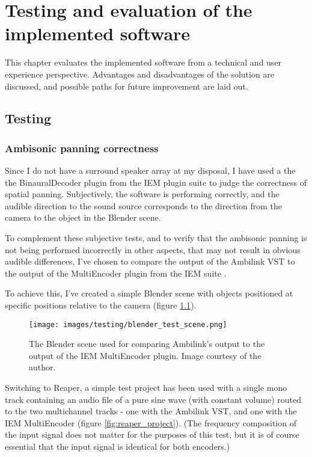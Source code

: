 \chapter{Testing and evaluation of the implemented software}
\begin{chapterabstract}
    This chapter evaluates the implemented software from a technical and user experience perspective.
    Advantages and disadvantages of the solution are discussed, and possible paths for 
    future improvement are laid out. 
\end{chapterabstract}

\section{Testing}
\subsection{Ambisonic panning correctness}
Since I do not have a surround speaker array at my disposal, I have used a the 
the BinauralDecoder plugin from the IEM plugin suite \cite{iem_plugin_suite} to judge the 
correctness of spatial panning. Subjectively, the software is performing correctly, 
and the audible direction to the sound source corresponds to the direction from the camera to 
the object in the Blender scene.

To complement these subjective tests, and to verify that the ambisonic panning is not 
being performed incorrectly in other aspects, that may not result in obvious audible differences,
I've chosen to compare the output of the Ambilink VST to the output of the MultiEncoder plugin from the IEM suite \cite{iem_plugin_suite}.

To achieve this, I've created a simple Blender scene with objects positioned
at specific positions relative to the camera (figure \ref{fig:blender_test_scene}).
\begin{figure}
    \centering
    \texttt{[image: images/testing/blender\_test\_scene.png]}       
    \caption{The Blender scene used for comparing Ambilink's output to the output of the IEM MultiEncoder plugin.
        Image courtesy of the author.
        \label{fig:blender_test_scene}}
\end{figure}
Switching to Reaper, a simple test project has been used with a single mono track containing an audio file 
of a pure sine wave (with constant volume) routed to the two multichannel tracks - one with the Ambilink VST, 
and one with the IEM MultiEncoder (figure \ref{fig:reaper_project}). 
(The frequency composition of the input signal does not matter for the purposes of this test, 
but it is of course essential that the input signal is identical for both encoders.)

